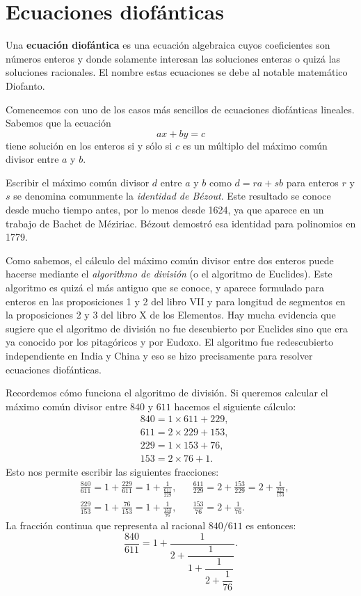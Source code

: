 \chapter{Ecuaciones diofánticas}

Una \textbf{ecuación diofántica} es una ecuación algebraica cuyos coeficientes
son números enteros y donde solamente interesan las soluciones enteras o quizá
las soluciones racionales. El nombre estas ecuaciones se debe al notable
matemático Diofanto. 

\begin{example}
	Comencemos con uno de los casos más sencillos de ecuaciones diofánticas
	lineales.  Sabemos que la ecuación 
	\[
		ax+by=c
	\]
	tiene solución en los enteros si y sólo si $c$ es un múltiplo del máximo
	común divisor entre $a$ y $b$.
\end{example}

Escribir el máximo común divisor $d$ entre $a$ y $b$ como $d=ra+sb$ para
enteros $r$ y $s$ se denomina comunmente la \emph{identidad de Bézout}. Este
resultado se conoce desde mucho tiempo antes, por lo menos desde 1624, ya que
aparece en un trabajo de Bachet de Méziriac.  Bézout demostró esa identidad
para polinomios en 1779.

Como sabemos, el cálculo del máximo común divisor entre dos enteros puede
hacerse mediante el \emph{algorithmo de división} (o el algoritmo de Euclides).
Este algoritmo es quizá el más antiguo que se conoce, y aparece formulado para
enteros en las proposiciones 1 y 2 del libro VII y para longitud de segmentos
en la proposiciones 2 y 3 del libro X de los Elementos. Hay mucha evidencia que
sugiere que el algoritmo de división no fue descubierto por Euclides sino que
era ya conocido por los pitagóricos y por Eudoxo. El algoritmo fue
redescubierto independiente en India y China y eso se hizo precisamente para
resolver ecuaciones diofánticas. 

Recordemos cómo funciona el algoritmo de división. Si queremos calcular el
máximo común divisor entre $840$ y $611$ hacemos el siguiente cálculo:
\begin{align*}
	& 840 = 1\times 611+229,\\
	& 611 = 2\times 229+153,\\
	& 229 = 1\times 153+76,\\
	& 153 = 2\times 76+1.
\end{align*}
Esto nos permite escribir las siguientes fracciones:
\begin{align*}
	&\frac{840}{611} = 1+\frac{229}{611}=1+\frac{1}{\frac{611}{229}},
	&&\frac{611}{229} = 2+\frac{153}{229}=2+\frac{1}{\frac{229}{153}},\\
	&\frac{229}{153} = 1+\frac{76}{153}=1+\frac{1}{\frac{153}{76}},
	&&\frac{153}{76} = 2+\frac{1}{76}.
\end{align*}
La fracción continua que representa al racional $840/611$ es entonces:
\[
	\dfrac{840}{611}=1+\dfrac{1}{2+\dfrac{1}{1+\dfrac{1}{2+\dfrac{1}{76}}}}.
\]

